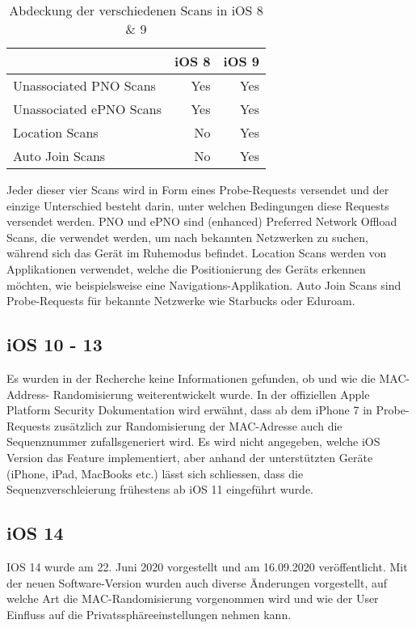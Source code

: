 \begin{table}[H]
    \begin{tabularx}{\linewidth}{|X|r|r|}
        \hline
            & \textbf{iOS 8} & \textbf{iOS 9} \\
        \hline
        Unassociated PNO Scans & Yes & Yes \\
        Unassociated ePNO Scans & Yes & Yes \\
        Location Scans & No & Yes \\
        Auto Join Scans & No & Yes \\
        \hline 
    \end{tabularx}
    \caption{Abdeckung der verschiedenen Scans in iOS 8 \& 9
    \label{table:iosversionninediff}}
\end{table}

Jeder dieser vier Scans wird in Form eines Probe-Requests versendet und der einzige
Unterschied besteht darin, unter welchen Bedingungen diese Requests versendet werden.
PNO und ePNO sind (enhanced) Preferred Network Offload Scans, die verwendet werden,
um nach bekannten Netzwerken zu suchen, während sich das Gerät im Ruhemodus befindet.
Location Scans werden von Applikationen verwendet, welche die Positionierung des 
Geräts erkennen möchten, wie beispielsweise eine Navigations-Applikation.
Auto Join Scans sind Probe-Requests für bekannte Netzwerke wie Starbucks oder 
Eduroam.

\clearpage

\subsection{iOS 10 - 13}
Es wurden in der Recherche keine Informationen gefunden, ob und wie die MAC-Address-
Randomisierung weiterentwickelt wurde. 
In der offiziellen Apple Platform Security Dokumentation wird erwähnt, dass
ab dem iPhone 7 in Probe-Requests zusätzlich zur Randomisierung der MAC-Adresse 
auch die Sequenznummer zufallsgeneriert wird. 
Es wird nicht angegeben, welche iOS Version das Feature implementiert, aber 
anhand der unterstützten Geräte (iPhone, iPad, MacBooks etc.) lässt sich schliessen,
dass die Sequenzverschleierung frühestens ab iOS 11 eingeführt wurde.

\subsection{iOS 14}
IOS 14 wurde am 22. Juni 2020 vorgestellt und am 16.09.2020 veröffentlicht.
Mit der neuen Software-Version wurden auch diverse Änderungen vorgestellt, 
auf welche Art die MAC-Randomisierung vorgenommen wird und wie der User Einfluss
auf die Privatssphäreeinstellungen nehmen kann.

